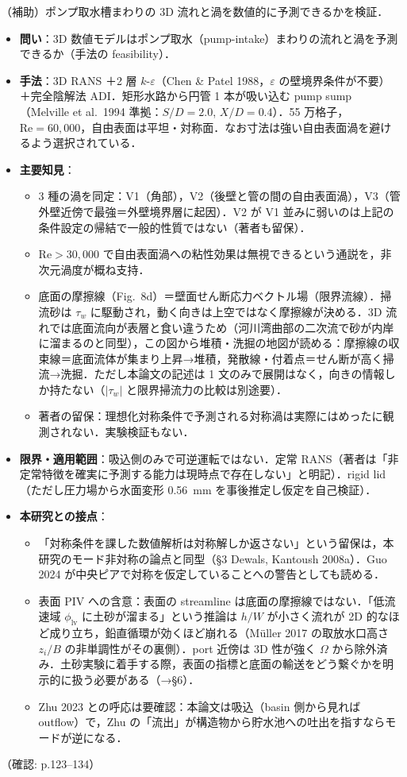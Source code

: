\documentclass[11pt]{jsarticle}
\newcommand{\litref}[1]{{\large\bfseries\color{citecolor}#1}}
\begin{document}
\noindent\litref{Constantinescu \& Patel (1998)}\quad（補助）ポンプ取水槽まわりの 3D 流れと渦を数値的に予測できるかを検証．
\begin{itemize}
  \item \textbf{問い}：3D 数値モデルはポンプ取水（pump-intake）まわりの流れと渦を予測できるか（手法の feasibility）．
  \item \textbf{手法}：3D RANS ＋2 層 $k$-$\varepsilon$（Chen \& Patel 1988，$\varepsilon$ の壁境界条件が不要）＋完全陰解法 ADI．矩形水路から円管 1 本が吸い込む pump sump（Melville et al.\ 1994 準拠：$S/D = 2.0$, $X/D = 0.4$）．55 万格子，$\mathrm{Re} = 60{,}000$，自由表面は平坦・対称面．なお寸法は強い自由表面渦を避けるよう選択されている．
  \item \textbf{主要知見}：
  \begin{itemize}
    \item 3 種の渦を同定：V1（角部），V2（後壁と管の間の自由表面渦），V3（管外壁近傍で最強＝外壁境界層に起因）．V2 が V1 並みに弱いのは上記の条件設定の帰結で一般的性質ではない（著者も留保）．
    \item $\mathrm{Re} > 30{,}000$ で自由表面渦への粘性効果は無視できるという通説を，非次元渦度が概ね支持．
    \item 底面の摩擦線（Fig.~8d）＝壁面せん断応力ベクトル場（限界流線）．掃流砂は $\tau_w$ に駆動され，動く向きは上空ではなく摩擦線が決める．3D 流れでは底面流向が表層と食い違うため（河川湾曲部の二次流で砂が内岸に溜まるのと同型），この図から堆積・洗掘の地図が読める：摩擦線の収束線＝底面流体が集まり上昇→堆積，発散線・付着点＝せん断が高く掃流→洗掘．ただし本論文の記述は 1 文のみで展開はなく，向きの情報しか持たない（$|\tau_w|$ と限界掃流力の比較は別途要）．
    \item 著者の留保：理想化対称条件で予測される対称渦は実際にはめったに観測されない．実験検証もない．
  \end{itemize}
  \item \textbf{限界・適用範囲}：吸込側のみで可逆運転ではない．定常 RANS（著者は「非定常特徴を確実に予測する能力は現時点で存在しない」と明記）．rigid lid（ただし圧力場から水面変形 0.56~mm を事後推定し仮定を自己検証）．
  \item \textbf{本研究との接点}：
  \begin{itemize}
    \item 「対称条件を課した数値解析は対称解しか返さない」という留保は，本研究のモード非対称の論点と同型（§3 Dewals, Kantoush 2008a）．Guo 2024 が中央ピアで対称を仮定していることへの警告としても読める．
    \item 表面 PIV への含意：表面の streamline は底面の摩擦線ではない．「低流速域 $\phi_\mathrm{lv}$ に土砂が溜まる」という推論は $h/W$ が小さく流れが 2D 的なほど成り立ち，鉛直循環が効くほど崩れる（M\"uller 2017 の取放水口高さ $z_i/B$ の非単調性がその裏側）．port 近傍は 3D 性が強く $\Omega$ から除外済み．土砂実験に着手する際，表面の指標と底面の輸送をどう繋ぐかを明示的に扱う必要がある（→§6）．
    \item Zhu 2023 との呼応は要確認：本論文は吸込（basin 側から見れば outflow）で，Zhu の「流出」が構造物から貯水池への吐出を指すならモードが逆になる．
  \end{itemize}
\end{itemize}
\noindent（確認: p.123--134）
\end{document}
